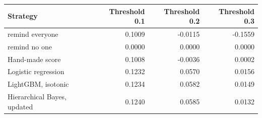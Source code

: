 \begin{tabular}{lrrr}
\toprule
Strategy & Threshold 0.1 & Threshold 0.2 & Threshold 0.3 \\
\midrule
remind everyone & 0.1009 & -0.0115 & -0.1559 \\
remind no one & 0.0000 & 0.0000 & 0.0000 \\
Hand-made score & 0.1008 & -0.0036 & 0.0002 \\
Logistic regression & 0.1232 & 0.0570 & 0.0156 \\
LightGBM, isotonic & 0.1234 & 0.0582 & 0.0149 \\
Hierarchical Bayes, updated & 0.1240 & 0.0585 & 0.0132 \\
\bottomrule
\end{tabular}
